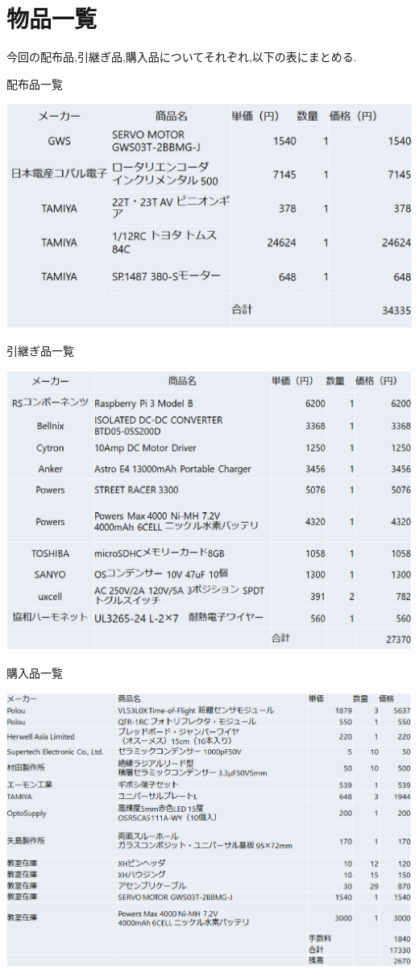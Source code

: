 \section{物品一覧}
今回の配布品,引継ぎ品,購入品についてそれぞれ,以下の表にまとめる.
\begin{table}[h]
	\centering
	\caption{配布品一覧}
	\includegraphics[clip,scale=0.5]{picture/eps/distributed_part.eps}
    \label{distribution}
\end{table}

\begin{table}[h]
	\centering
	\caption{引継ぎ品一覧}
	\includegraphics[clip,scale=0.5]{picture/eps/old_part.eps}
 \label{old}
\end{table}

\begin{table}[h]
	\centering
	\caption{購入品一覧}
	\includegraphics[clip,scale=0.5]{picture/eps/new_part.eps}
    \label{new}
\end{table}
